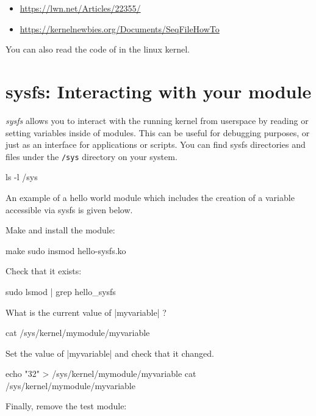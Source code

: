 \documentclass[10pt, oneside]{book}
\begin{document}
\begin{itemize}
  \item \url{https://lwn.net/Articles/22355/}
  \item \url{https://kernelnewbies.org/Documents/SeqFileHowTo}
\end{itemize}

You can also read the code of  in the linux kernel.

\section{sysfs: Interacting with your module}
\label{sec:sysfs}
\emph{sysfs} allows you to interact with the running kernel from userspace by reading or setting variables inside of modules.
This can be useful for debugging purposes, or just as an interface for applications or scripts.
You can find sysfs directories and files under the \verb|/sys| directory on your system.

\begin{codebash}
ls -l /sys
\end{codebash}

An example of a hello world module which includes the creation of a variable accessible via sysfs is given below.


Make and install the module:

\begin{codebash}
make
sudo insmod hello-sysfs.ko
\end{codebash}

Check that it exists:

\begin{codebash}
sudo lsmod | grep hello_sysfs
\end{codebash}

What is the current value of \cpp|myvariable| ?

\begin{codebash}
cat /sys/kernel/mymodule/myvariable
\end{codebash}

Set the value of \cpp|myvariable| and check that it changed.

\begin{codebash}
echo "32" > /sys/kernel/mymodule/myvariable
cat /sys/kernel/mymodule/myvariable
\end{codebash}

Finally, remove the test module:
\end{document}
